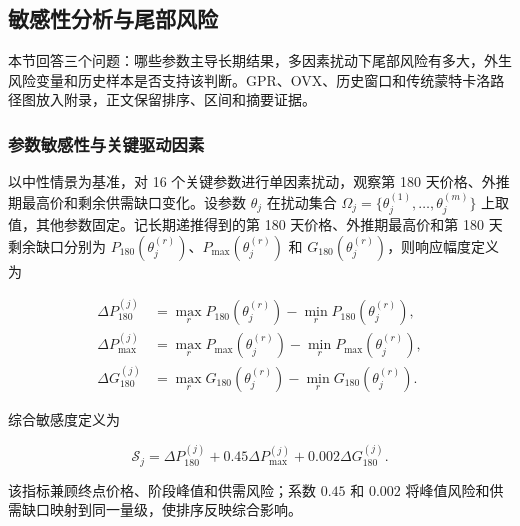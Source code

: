 \subsection{敏感性分析与尾部风险}

本节回答三个问题：哪些参数主导长期结果，多因素扰动下尾部风险有多大，外生风险变量和历史样本是否支持该判断。GPR、OVX、历史窗口和传统蒙特卡洛路径图放入附录，正文保留排序、区间和摘要证据。

\subsubsection{参数敏感性与关键驱动因素}

以中性情景为基准，对 16 个关键参数进行单因素扰动，观察第 180 天价格、外推期最高价和剩余供需缺口变化。设参数 \(\theta_j\) 在扰动集合 \(\Omega_j=\{\theta_j^{(1)},\ldots,\theta_j^{(m)}\}\) 上取值，其他参数固定。记长期递推得到的第 180 天价格、外推期最高价和第 180 天剩余缺口分别为 \(P_{180}(\theta_j^{(r)})\)、\(P_{\max}(\theta_j^{(r)})\) 和 \(G_{180}(\theta_j^{(r)})\)，则响应幅度定义为

\begin{equation}
\begin{aligned}
  \Delta P_{180}^{(j)}&=\max_{r}P_{180}(\theta_j^{(r)})-\min_{r}P_{180}(\theta_j^{(r)}),\\
  \Delta P_{\max}^{(j)}&=\max_{r}P_{\max}(\theta_j^{(r)})-\min_{r}P_{\max}(\theta_j^{(r)}),\\
  \Delta G_{180}^{(j)}&=\max_{r}G_{180}(\theta_j^{(r)})-\min_{r}G_{180}(\theta_j^{(r)}).
\end{aligned}
\end{equation}

综合敏感度定义为

\begin{equation}
  \mathcal S_j
  =
  \Delta P_{180}^{(j)}
  +0.45\Delta P_{\max}^{(j)}
  +0.002\Delta G_{180}^{(j)}.
\end{equation}

该指标兼顾终点价格、阶段峰值和供需风险；系数 \(0.45\) 和 \(0.002\) 将峰值风险和供需缺口映射到同一量级，使排序反映综合影响。

